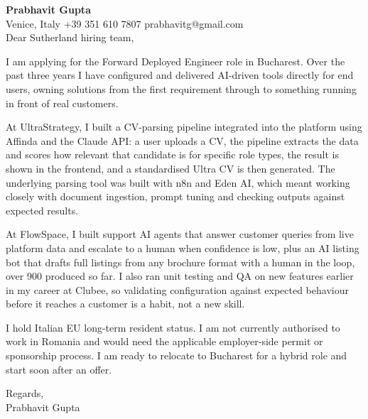 \documentclass[a4paper,10.5pt]{article}
\begin{document}
\textbf{Prabhavit Gupta}\\
Venice, Italy \textbar{} +39 351 610 7807 \textbar{} prabhavitg@gmail.com\\[10pt]
Dear Sutherland hiring team,

I am applying for the Forward Deployed Engineer role in Bucharest. Over the past three years I have configured and delivered AI-driven tools directly for end users, owning solutions from the first requirement through to something running in front of real customers.

At UltraStrategy, I built a CV-parsing pipeline integrated into the platform using Affinda and the Claude API: a user uploads a CV, the pipeline extracts the data and scores how relevant that candidate is for specific role types, the result is shown in the frontend, and a standardised Ultra CV is then generated. The underlying parsing tool was built with n8n and Eden AI, which meant working closely with document ingestion, prompt tuning and checking outputs against expected results.

At FlowSpace, I built support AI agents that answer customer queries from live platform data and escalate to a human when confidence is low, plus an AI listing bot that drafts full listings from any brochure format with a human in the loop, over 900 produced so far. I also ran unit testing and QA on new features earlier in my career at Clubee, so validating configuration against expected behaviour before it reaches a customer is a habit, not a new skill.

I hold Italian EU long-term resident status. I am not currently authorised to work in Romania and would need the applicable employer-side permit or sponsorship process. I am ready to relocate to Bucharest for a hybrid role and start soon after an offer.

Regards,\\
Prabhavit Gupta
\end{document}
